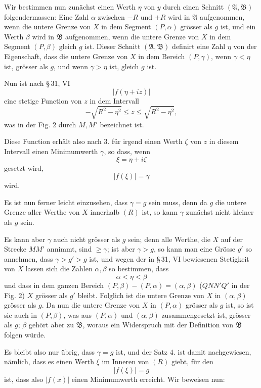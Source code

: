 \documentclass[11pt]{article}
\begin{document}
Wir bestimmen nun zunächst einen Werth $\eta$ von $y$ durch einen Schnitt $(\mathfrak A,\mathfrak B)$ folgendermassen: Eine Zahl $\alpha$ zwischen $-R$ und $+R$ wird in $\mathfrak A$ aufgenommen, wenn die untere Grenze von $X$ in dem Segment $(P,\alpha)$ grösser als $g$ ist, und ein Werth $\beta$ wird in $\mathfrak B$ aufgenommen, wenn die untere Grenze von $X$ in dem Segment $(P,\beta)$ gleich $g$ ist. Dieser Schnitt $(\mathfrak A,\mathfrak B)$ definirt eine Zahl $\eta$ von der Eigenschaft, dass die untere Grenze von $X$ in dem Bereich $(P,\gamma)$, wenn $\gamma<\eta$ ist, grösser als $g$, und wenn $\gamma>\eta$ ist, gleich $g$ ist.

Nun ist nach \S\,31, VI
\[
 |f(\eta+iz)|
\]
eine stetige Function von $z$ in dem Intervall
\begin{equation}
 -\sqrt{R^2-\eta^2}\le z\le \sqrt{R^2-\eta^2},
\tag{8}
\end{equation}
was in der Fig. 2 durch $M,M'$ bezeichnet ist.

Diese Function erhält also nach 3. für irgend einen Werth $\zeta$ von $z$ in diesem Intervall einen Minimumwerth $\gamma$, so dass, wenn
\[
 \xi=\eta+i\zeta
\]
gesetzt wird,
\begin{equation}
 |f(\xi)|=\gamma
\tag{9}
\end{equation}
wird.

Es ist nun ferner leicht einzusehen, dass $\gamma=g$ sein muss, denn da $g$ die untere Grenze aller Werthe von $X$ innerhalb $(R)$ ist, so kann $\gamma$ zunächst nicht kleiner als $g$ sein.

Es kann aber $\gamma$ auch nicht grösser als $g$ sein; denn alle Werthe, die $X$ auf der Strecke $MM'$ annimmt, sind $\ge\gamma$; ist aber $\gamma>g$, so kann man eine Grösse $g'$ so annehmen, dass $\gamma>g'>g$ ist, und wegen der in \S\,31, VI bewiesenen Stetigkeit von $X$ lassen sich die Zahlen $\alpha,\beta$ so bestimmen, dass
\[
 \alpha<\eta<\beta
\]
und dass in dem ganzen Bereich $(P,\beta)-(P,\alpha)=(\alpha,\beta)$ ($QNN'Q'$ in der Fig. 2) $X$ grösser als $g'$ bleibt. Folglich ist die untere Grenze von $X$ in $(\alpha,\beta)$ grösser als $g$. Da nun die untere Grenze von $X$ in $(P,\alpha)$ grösser als $g$ ist, so ist sie auch in $(P,\beta)$, was aus $(P,\alpha)$ und $(\alpha,\beta)$ zusammengesetzt ist, grösser als $g$; $\beta$ gehört aber zu $\mathfrak B$, woraus ein Widerspruch mit der Definition von $\mathfrak B$ folgen würde.

Es bleibt also nur übrig, dass $\gamma=g$ ist, und der Satz 4. ist damit nachgewiesen, nämlich, dass es einen Werth $\xi$ im Inneren von $(R)$ giebt, für den
\[
 |f(\xi)|=g
\]
ist, dass also $|f(x)|$ einen Minimumwerth erreicht. Wir beweisen nun:
\end{document}

